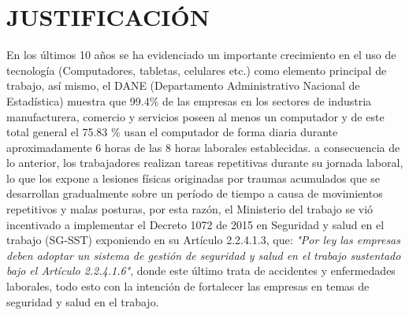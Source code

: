 \chapter{JUSTIFICACIÓN}
En los últimos 10 años se ha evidenciado un importante crecimiento en el uso de tecnología (Computadores, tabletas, celulares etc.) como elemento principal de trabajo, así mismo, el DANE (Departamento Administrativo Nacional de Estadística)  muestra que 99.4\% de las empresas en los sectores de industria manufacturera, comercio y servicios poseen al menos un computador y de este total general el 75.83 \% usan el computador de forma diaria durante aproximadamente 6 horas de las 8 horas laborales establecidas.\parencite[]{Dane2013IndicadoresEmpresas} a consecuencia de lo anterior, los trabajadores realizan tareas repetitivas durante su jornada laboral, lo que los expone a lesiones físicas originadas por traumas acumulados que se desarrollan gradualmente sobre un período de tiempo a causa de movimientos repetitivos y malas posturas, por esta razón, el Ministerio del trabajo se vió incentivado a implementar el Decreto 1072 de 2015 en Seguridad y salud en el trabajo (SG-SST) exponiendo en su Artículo 2.2.4.1.3, que: \textit{"Por ley las empresas deben adoptar un sistema de gestión de seguridad y salud en el trabajo sustentado bajo el Artículo 2.2.4.1.6"}, donde este último trata de accidentes y enfermedades laborales, todo esto con la intención de fortalecer las empresas en temas de seguridad y salud en el trabajo.  


